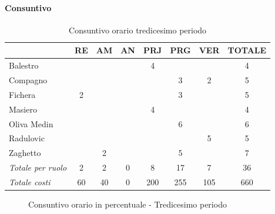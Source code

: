 \documentclass[a4paper,12pt]{article}
\begin{document}
            \paragraph{Consuntivo}
                \begin{table}[H]
                \centering
                \caption{Consuntivo orario tredicesimo periodo}
                \begin{tabular}{|l|c|c|c|c|c|c|c|}
                \hline
                    \rowcolor{lightgray}{\textbf{Membro}} & {\textbf{RE}} & {\textbf{AM}} & {\textbf{AN}} & {\textbf{PRJ}} & {\textbf{PRG}} & {\textbf{VER}} & {\textbf{TOTALE}}\\
                \hline
                    Balestro & & & & 4 & & & 4\\
                \hline
                    Compagno & & & & & 3 & 2 & 5\\
                \hline
                    Fichera & 2 & & & & 3 & & 5\\
                \hline
                    Masiero & & & & 4 & & & 4\\
                \hline
                    Oliva Medin & & & & & 6 & & 6\\
                \hline
                    Radulovic & & & & & & 5 & 5\\
                \hline
                    Zaghetto & & 2 & & & 5 & & 7\\
                \hline
                    \rowcolor{lightgray}\textit{Totale per ruolo} & 2 & 2 & 0 & 8 & 17 & 7 & 36\\
                \hline
                    \rowcolor{lightgray}\textit{Totale costi} & 60 & 40 & 0 & 200 & 255 & 105 & 660\\
                \hline
                \end{tabular}
                \end{table}

                \begin{figure}[H]
                \centering
                \caption{Consuntivo orario in percentuale - Tredicesimo periodo}
                \end{figure}
                
\end{document}

